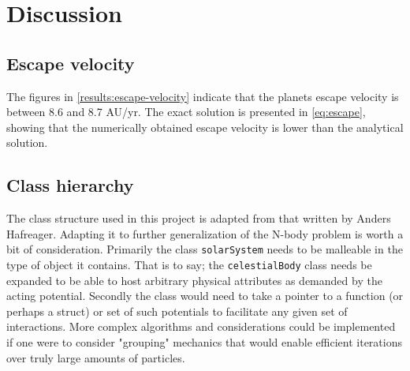 \section{Discussion}
\subsection{Escape velocity}
The figures in \ref{results:escape-velocity} indicate that the planets escape velocity is between
8.6 and 8.7 AU/yr. The exact solution is presented in \ref{eq:escape}, showing that the numerically
obtained escape velocity is lower than the analytical solution.


\subsection*{Class hierarchy}

The class structure used in this project is adapted from that written by Anders Hafreager. Adapting it to further generalization of the N-body problem is worth a bit of consideration. Primarily the class \lstinline{solarSystem} needs to be malleable  in the type of object it contains. That is to say; the \lstinline{celestialBody} class needs be expanded to be able to host arbitrary physical attributes as demanded by the acting potential. Secondly the class would need to take a pointer to a function (or perhaps a struct) or set of such potentials to facilitate any given set of interactions. More complex algorithms and considerations could be implemented if one were to consider "grouping" mechanics that would enable efficient iterations over truly large amounts of particles.